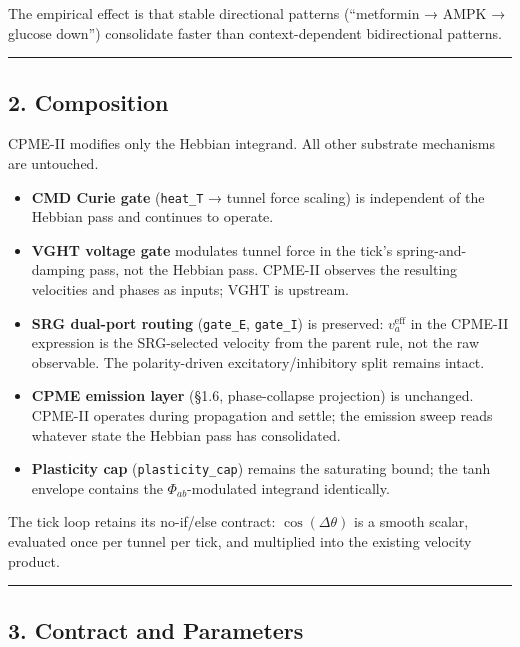 \documentclass[
  11pt,
  a4paper,
]{article}
\providecommand{\tightlist}{%
  \setlength{\itemsep}{0pt}\setlength{\parskip}{0pt}}
\begin{document}
The empirical effect is that stable directional patterns (``metformin →
AMPK → glucose down'') consolidate faster than context-dependent
bidirectional patterns.

\begin{center}\rule{0.5\linewidth}{0.5pt}\end{center}

\subsection{2. Composition}\label{composition}

CPME-II modifies only the Hebbian integrand. All other substrate
mechanisms are untouched.

\begin{itemize}
\tightlist
\item
  \textbf{CMD Curie gate} (\texttt{heat\_T} → tunnel force scaling) is
  independent of the Hebbian pass and continues to operate.
\item
  \textbf{VGHT voltage gate} modulates tunnel force in the tick's
  spring-and-damping pass, not the Hebbian pass. CPME-II observes the
  resulting velocities and phases as inputs; VGHT is upstream.
\item
  \textbf{SRG dual-port routing} (\texttt{gate\_E}, \texttt{gate\_I}) is
  preserved: \(v_a^{\text{eff}}\) in the CPME-II expression is the
  SRG-selected velocity from the parent rule, not the raw observable.
  The polarity-driven excitatory/inhibitory split remains intact.
\item
  \textbf{CPME emission layer} (§1.6, phase-collapse projection) is
  unchanged. CPME-II operates during propagation and settle; the
  emission sweep reads whatever state the Hebbian pass has consolidated.
\item
  \textbf{Plasticity cap} (\texttt{plasticity\_cap}) remains the
  saturating bound; the tanh envelope contains the
  \(\Phi_{ab}\)-modulated integrand identically.
\end{itemize}

The tick loop retains its no-if/else contract: \(\cos(\Delta \theta)\)
is a smooth scalar, evaluated once per tunnel per tick, and multiplied
into the existing velocity product.

\begin{center}\rule{0.5\linewidth}{0.5pt}\end{center}

\subsection{3. Contract and Parameters}\label{contract-and-parameters}
\end{document}
